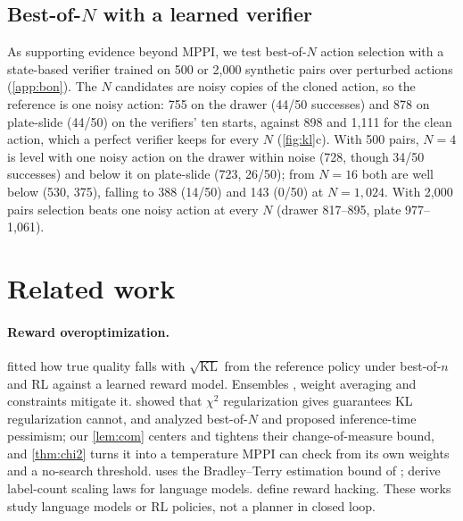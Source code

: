 \documentclass{article}
\theoremstyle{plain}
\theoremstyle{remark}
\newcommand{\KL}{\mathrm{KL}}
\begin{document}
\subsection{Best-of-$N$ with a learned verifier}
\label{sec:exp-bon}

As supporting evidence beyond MPPI, we test best-of-$N$ action selection \citep{kwok2025robomonkey} with a state-based
verifier trained on 500 or 2,000 synthetic pairs over perturbed actions (\cref{app:bon}). The $N$ candidates are noisy copies of the cloned action, so
the reference is one noisy action: 755 on the drawer (44/50 successes) and 878 on plate-slide (44/50) on the verifiers'
ten starts, against 898 and 1,111 for the clean action, which a perfect verifier keeps for every $N$ (\cref{fig:kl}c).
With 500 pairs, $N=4$ is level with one noisy action on the drawer within noise (728, though 34/50 successes) and below
it on plate-slide (723, 26/50); from $N=16$ both are well below (530, 375), falling to 388 (14/50) and 143 (0/50) at
$N=1{,}024$. With 2,000 pairs selection beats one noisy action
at every $N$ (drawer 817--895, plate 977--1,061).

\section{Related work}
\label{sec:related}

\paragraph{Reward overoptimization.} \citet{gao2023scaling} fitted how true quality falls with $\sqrt{\KL}$ from the
reference policy under best-of-$n$ and RL against a learned reward model.
Ensembles \citep{coste2024ensembles,eisenstein2024helping,zhai2026uncertainty}, weight averaging \citep{rame2024warm} and
constraints \citep{moskovitz2024confronting} mitigate it. \citet{huang2025chipo} showed that $\chi^2$ regularization gives
guarantees KL regularization cannot, and \citet{huang2025bestofn} analyzed best-of-$N$ and proposed
inference-time pessimism; our \cref{lem:com} centers and tightens their change-of-measure bound, and \cref{thm:chi2}
turns it into a temperature MPPI can check from its own weights and a no-search threshold.  uses the Bradley--Terry estimation bound of
\citet{zhu2023principled}; \citet{aouad2026revisiting} derive label-count scaling laws for language models. \citet{skalse2022defining,pan2022effects,laidlaw2025correlated} define reward hacking. These works study language
models or RL policies, not a planner in closed loop.
\end{document}
